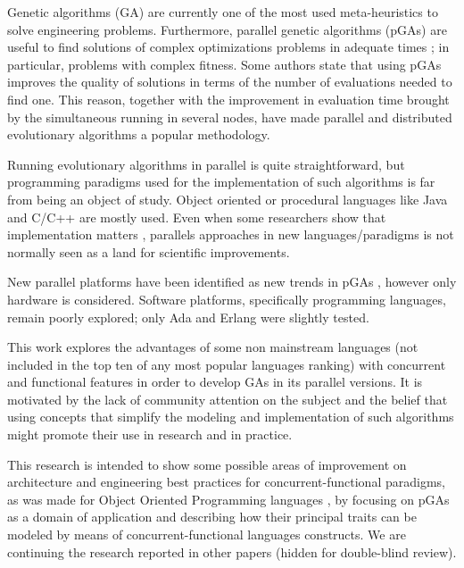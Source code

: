 
\noindent Genetic algorithms (GA) \cite{GA_Goldberg89} are currently one of the most used meta-heuristics to solve engineering problems. Furthermore, parallel genetic algorithms (pGAs) are useful to find  solutions of complex optimizations problems in adequate times \cite{Luque2011}; in particular, problems with complex fitness. Some authors \cite{Alba2001} state that using pGAs improves the quality of solutions in terms of the number of evaluations needed to find one. This reason, together with the improvement in evaluation time brought by the simultaneous running in several nodes, have made parallel and distributed evolutionary algorithms a popular methodology.

Running evolutionary algorithms in parallel is quite straightforward, but programming paradigms used for the implementation of such algorithms is far from being an object of study. Object oriented or procedural languages like Java and C/C++ are mostly used. Even when some researchers show that implementation matters \cite{DBLP:conf/iwann/MereloRACML11}, parallels approaches in new languages/paradigms is not normally seen as a land for scientific improvements.

New parallel platforms have been identified as new trends in pGAs \cite{Luque2011}, however only hardware is considered. Software platforms, specifically programming languages, remain poorly explored; only Ada \cite{Santos2002} and Erlang \cite{A.Bienz2011,Kerdprasop2013} were slightly tested.


This work explores the advantages of some non mainstream languages (not included in the top ten of any most popular languages ranking) with concurrent and functional features in order to develop GAs in its parallel versions. It is motivated by the lack of community attention on the subject and the belief that using concepts that simplify the modeling and implementation of such algorithms might promote their use in research  and in practice.

This research is intended to show some possible areas of improvement on architecture and engineering best practices for concurrent-functional paradigms, as was made for Object Oriented Programming languages \cite{EO:FEA2000}, by focusing on pGAs as a domain of application and describing how their principal traits can be modeled by means of concurrent-functional languages constructs. We are continuing the research reported in 
other papers (hidden for double-blind review).

